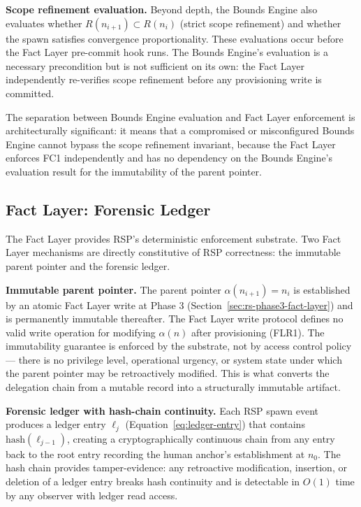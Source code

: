 \medskip
\noindent\textbf{Scope refinement evaluation.} Beyond depth, the Bounds Engine also evaluates whether $R(n_{i+1}) \subset R(n_i)$ (strict scope refinement) and whether the spawn satisfies convergence proportionality. These evaluations occur before the Fact Layer pre-commit hook runs. The Bounds Engine's evaluation is a necessary precondition but is not sufficient on its own: the Fact Layer independently re-verifies scope refinement before any provisioning write is committed.

The separation between Bounds Engine evaluation and Fact Layer enforcement is architecturally significant: it means that a compromised or misconfigured Bounds Engine cannot bypass the scope refinement invariant, because the Fact Layer enforces FC1 independently and has no dependency on the Bounds Engine's evaluation result for the immutability of the parent pointer.

\subsection{Fact Layer: Forensic Ledger}
\label{sec:rs-fact-layer}

The Fact Layer provides RSP's deterministic enforcement substrate. Two Fact Layer mechanisms are directly constitutive of RSP correctness: the immutable parent pointer and the forensic ledger.

\medskip
\noindent\textbf{Immutable parent pointer.} The parent pointer $\alpha(n_{i+1}) = n_i$ is established by an atomic Fact Layer write at Phase 3 (Section~\ref{sec:rs-phase3-fact-layer}) and is permanently immutable thereafter. The Fact Layer write protocol defines no valid write operation for modifying $\alpha(n)$ after provisioning (FLR1). The immutability guarantee is enforced by the substrate, not by access control policy --- there is no privilege level, operational urgency, or system state under which the parent pointer may be retroactively modified. This is what converts the delegation chain from a mutable record into a structurally immutable artifact.

\medskip
\noindent\textbf{Forensic ledger with hash-chain continuity.} Each RSP spawn event produces a ledger entry $\ell_j$ (Equation~\ref{eq:ledger-entry}) that contains $\text{hash}(\ell_{j-1})$, creating a cryptographically continuous chain from any entry back to the root entry recording the human anchor's establishment at $n_0$. The hash chain provides tamper-evidence: any retroactive modification, insertion, or deletion of a ledger entry breaks hash continuity and is detectable in $O(1)$ time by any observer with ledger read access.

